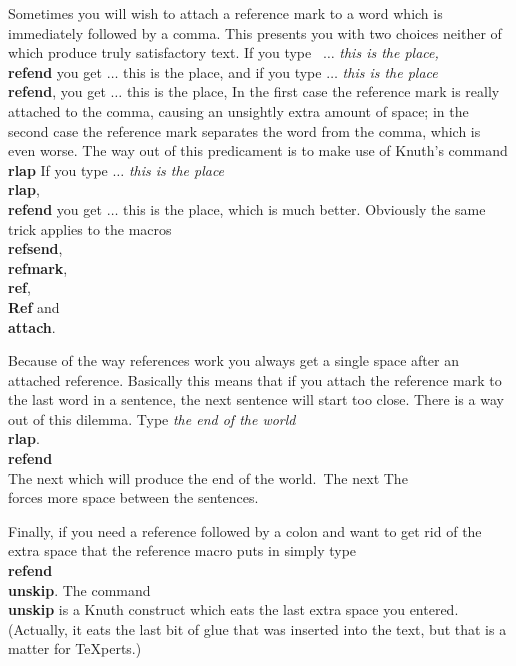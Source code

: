 Sometimes you will wish to attach a reference mark to a word
which is immediately followed by a comma.
This presents you with two choices neither of which produce
truly satisfactory text.
If you type \nextline
\ $\ldots $ {\it this is the place,}{\bf \\refend} \nextline
you get \nextline
$\ldots $ this is the place, \nextline
and if you type  \nextline
$\ldots $ {\it this is the place}{\bf \\refend}, \nextline
you get
$\ldots $ this is the place , \nextline
In the first case the reference mark is really attached to the
comma, causing an unsightly extra amount of space;
in the second case the reference mark separates the word from
the comma, which is even worse.
The way out of this predicament is to make use of Knuth's
command {\bf \\rlap}
If you type \nextline
$\ldots $ {\it this is the place}{\bf \\rlap},{\bf \\refend} \nextline
you get \nextline
$\ldots $ this is the place\rlap, \nextline
which is much better.
Obviously the same trick applies to the macros
{\bf \\refsend}, {\bf \\refmark}, {\bf \\ref}, {\bf \\Ref} and
{\bf \\attach}.
 
Because of the way references work you always get a single
space after an attached reference.
Basically this means that if you attach the reference mark to
the last word in a sentence, the next sentence will start too
close.
There is a way out of this dilemma.
Type  \nextline
{\it the  end of the world}{\bf \\rlap}.{\bf \\refend\\ \quad}
The next\nextline
which will produce \nextline
the end of the world\rlap .\   The next \nextline
The {\bf \\ \quad} forces more space between the sentences.
 
Finally, if you need a reference followed by a colon and want
to get rid of the extra space that the reference macro puts in
simply type {\bf \\refend\\unskip}.
The command {\bf \\unskip} is a Knuth construct which eats
the last extra space you entered.
(Actually, it eats the last bit of glue that
was inserted into the text, but that is a matter for \TeX perts.)
 
